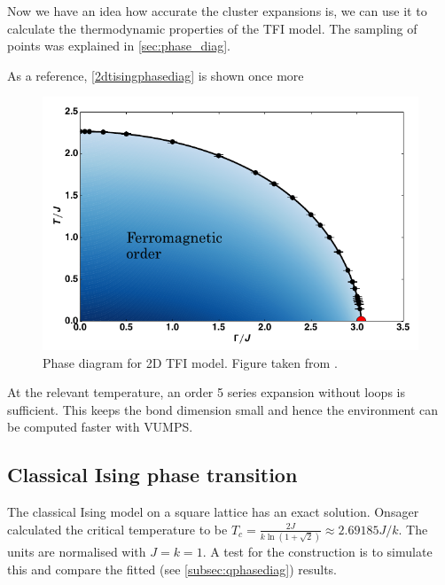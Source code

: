 
Now we have an idea how accurate the cluster expansions is, we can use it to calculate the thermodynamic properties of the \Gls{TFI} model. The sampling of points was explained in \cref{sec:phase_diag}.

As a reference, \cref{2dtisingphasediag} is shown once more

\begin{figure}[h!]
    \center
    \includegraphics[width=\textwidth]{Figuren/phsyics/2disingphase.png}
    \caption{Phase diagram for 2D \Gls{TFI} model. Figure taken from \cite{Hesselmann2016}.}
    \label{2dtisingphasediag2}
\end{figure}

At the relevant temperature, an order 5 series expansion without loops is sufficient. This keeps the bond dimension small and hence the environment can be computed faster with \Gls{VUMPS}.

\subsection{Classical Ising phase transition}
The classical Ising model on a square lattice has an exact solution. Onsager calculated the critical temperature to be $T_c = \frac{2 J}{k \ln(1+\sqrt{2}) } \approx 2.69185 J/k$.  The units are normalised with $J=k=1$. A test for the construction is to simulate this and compare the fitted (see \cref{subsec:qphasediag}) results.

